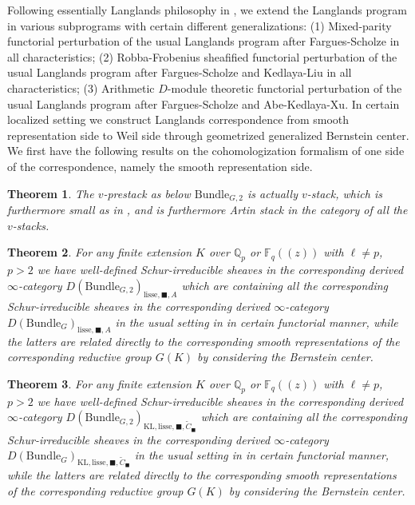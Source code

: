 \documentclass[12pt]{book}
\newtheorem{theorem}{Theorem}
\theoremstyle{definition}
\begin{document}
Following essentially Langlands philosophy in \cite{La}, we extend the Langlands program in various subprograms with certain different generalizations: (1) Mixed-parity functorial perturbation of the usual Langlands program after Fargues-Scholze in all characteristics; (2) Robba-Frobenius sheafified functorial perturbation of the usual Langlands program after Fargues-Scholze and Kedlaya-Liu in all characteristics; (3) Arithmetic $D$-module theoretic functorial perturbation of the usual Langlands program after Fargues-Scholze and Abe-Kedlaya-Xu. In certain localized setting we construct Langlands correspondence from smooth representation side to Weil side through geometrized generalized Bernstein center. We first have the following results on the cohomologization formalism of one side of the correspondence, namely the smooth representation side.


\begin{theorem}
The $v$-prestack as below $\mathrm{Bundle}_{G,2}$ is actually $v$-stack, which is furthermore small as in \cite{FS}, and is furthermore Artin stack in the category of all the $v$-stacks.
\end{theorem}

\begin{theorem}
For any finite extension $K$ over $\mathbb{Q}_p$ or $\mathbb{F}_q((z))$ with $\ell\neq p$, $p>2$ we have well-defined Schur-irreducible sheaves in the corresponding derived $\infty$-category $D(\mathrm{Bundle}_{G,2})_{\text{lisse},\blacksquare,A}$ which are containing all the corresponding Schur-irreducible sheaves in the corresponding derived $\infty$-category $D(\mathrm{Bundle}_{G})_{\text{lisse},\blacksquare,A}$ in the usual setting in \cite{FS} in certain functorial manner, while the latters are related directly to the corresponding smooth representations of the corresponding reductive group $G(K)$ by considering the Bernstein center.
\end{theorem}

\begin{theorem}
For any finite extension $K$ over $\mathbb{Q}_p$ or $\mathbb{F}_q((z))$ with $\ell\neq p$, $p>2$ we have well-defined Schur-irreducible sheaves in the corresponding derived $\infty$-category $D(\mathrm{Bundle}_{G,2})_{\text{KL},\mathrm{lisse},\blacksquare,\widetilde{C}_\blacksquare}$ which are containing all the corresponding Schur-irreducible sheaves in the corresponding derived $\infty$-category $D(\mathrm{Bundle}_{G})_{\text{KL},\mathrm{lisse},\blacksquare,\widetilde{C}_\blacksquare}$ in the usual setting in \cite{FS} in certain functorial manner, while the latters are related directly to the corresponding smooth representations of the corresponding reductive group $G(K)$ by considering the Bernstein center.
\end{theorem}
\end{document}
